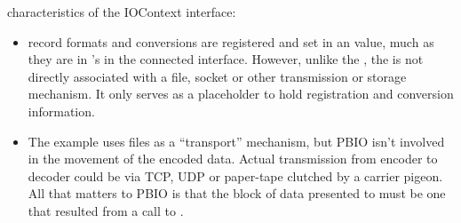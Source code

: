 characteristics of the IOContext interface:
\begin{itemize}
\item record formats and conversions are registered and set in an  value, much as they are in 's in the connected
interface.  However, unlike the , the  is not
directly associated with a file, socket or other transmission or storage
mechanism.  It only serves as a placeholder to hold registration and
conversion information.
\item The example uses files as a ``transport'' mechanism, but PBIO isn't
involved in the movement of the encoded data.  Actual transmission from
encoder to decoder could be via TCP, UDP or paper-tape clutched by a carrier
pigeon.  All that matters to PBIO is that the block of data presented to
 must be one that resulted from a call to
.
\end{itemize}

